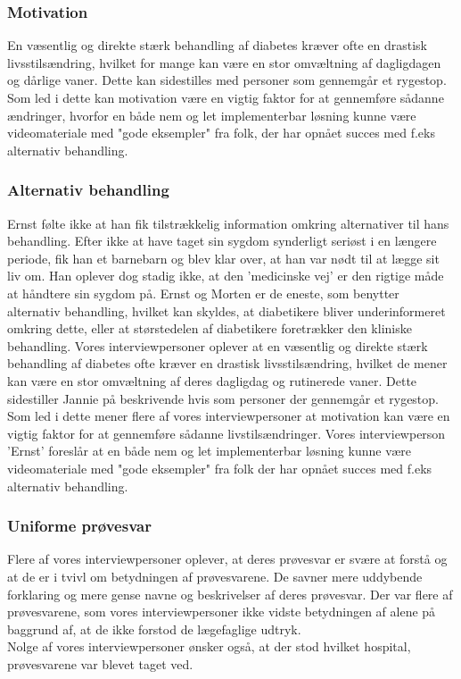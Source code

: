 \subsubsection{Motivation}
En væsentlig og direkte stærk behandling af diabetes kræver ofte en drastisk livsstilsændring, hvilket for mange kan være en stor omvæltning af dagligdagen og dårlige vaner. Dette kan sidestilles med personer som gennemgår et rygestop. Som led i dette kan motivation være en vigtig faktor for at gennemføre sådanne ændringer, hvorfor en både nem og let implementerbar løsning kunne være videomateriale med "gode eksempler" fra folk, der har opnået succes med f.eks alternativ behandling.

\subsubsection{Alternativ behandling}
Ernst følte ikke at han fik tilstrækkelig information omkring alternativer til hans behandling. Efter ikke at have taget sin sygdom synderligt seriøst i en længere periode, fik han et barnebarn og blev klar over, at han var nødt til at lægge sit liv om. Han oplever dog stadig ikke, at den 'medicinske vej' er den rigtige måde at håndtere sin sygdom på. Ernst og Morten er de eneste, som benytter alternativ behandling, hvilket kan skyldes, at diabetikere bliver underinformeret omkring dette, eller at størstedelen af diabetikere foretrækker den kliniske behandling. 
Vores interviewpersoner oplever at en væsentlig og direkte stærk behandling af diabetes ofte kræver en drastisk livsstilsændring, hvilket de mener kan være en stor omvæltning af deres dagligdag og rutinerede vaner. Dette sidestiller Jannie på beskrivende hvis som personer der gennemgår et rygestop. Som led i dette mener flere af vores interviewpersoner at motivation kan være en vigtig faktor for at gennemføre sådanne livstilsændringer. Vores interviewperson 'Ernst' foreslår at en både nem og let implementerbar løsning kunne være videomateriale med "gode eksempler" fra folk der har opnået succes med f.eks alternativ behandling.

\subsubsection{Uniforme prøvesvar}
Flere af vores interviewpersoner oplever, at deres prøvesvar er svære at forstå og at de er i tvivl om betydningen af prøvesvarene. De savner mere uddybende forklaring og mere gense navne og beskrivelser af deres prøvesvar. 
Der var flere af prøvesvarene, som vores interviewpersoner ikke vidste betydningen af alene på baggrund af, at de ikke forstod de lægefaglige udtryk.\\
Nolge af vores interviewpersoner ønsker også, at der stod hvilket hospital, prøvesvarene var blevet taget ved.


